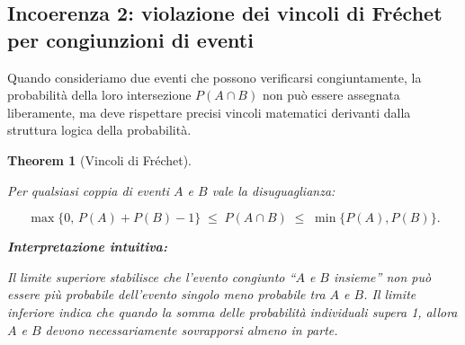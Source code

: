\documentclass[
  letterpaper,
  DIV=11,
  numbers=noendperiod,
  oneside]{scrreprt}
\theoremstyle{definition}
\theoremstyle{plain}
\newtheorem{theorem}{Theorem}[chapter]
\theoremstyle{definition}
\theoremstyle{remark}
\begin{document}
\subsection{Incoerenza 2: violazione dei vincoli di Fréchet per
congiunzioni di
eventi}\label{incoerenza-2-violazione-dei-vincoli-di-fruxe9chet-per-congiunzioni-di-eventi}

Quando consideriamo due eventi che possono verificarsi congiuntamente,
la probabilità della loro intersezione \(P(A \cap B)\) non può essere
assegnata liberamente, ma deve rispettare precisi vincoli matematici
derivanti dalla struttura logica della probabilità.

\begin{theorem}[Vincoli di
Fréchet]\protect\hypertarget{thm-frechet-bounds}{}\label{thm-frechet-bounds}

Per qualsiasi coppia di eventi \(A\) e \(B\) vale la disuguaglianza:

\[
\max\{0,\, P(A) + P(B) - 1\} \;\leq\; P(A \cap B) \;\leq\; \min\{P(A), P(B)\}.
\]

\textbf{Interpretazione intuitiva:}

Il limite superiore stabilisce che l'evento congiunto ``\(A\) e \(B\)
insieme'' non può essere più probabile dell'evento singolo meno
probabile tra \(A\) e \(B\). Il limite inferiore indica che quando la
somma delle probabilità individuali supera 1, allora \(A\) e \(B\)
devono necessariamente sovrapporsi almeno in parte.

\end{theorem}
\end{document}
